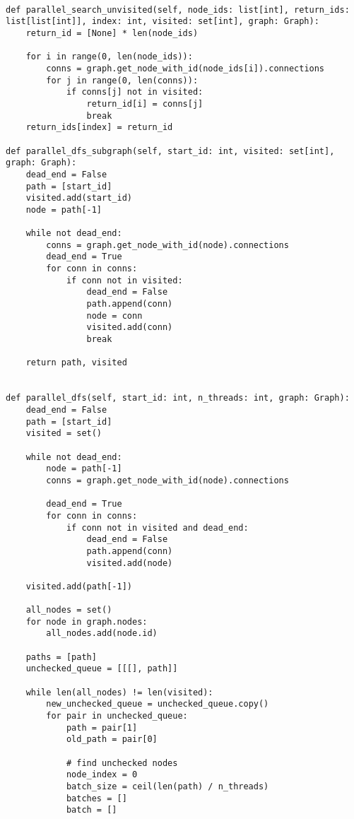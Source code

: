 \begin{lstlisting}[label=some-code-2,caption=Реализация параллельного алгоритма поиска в глубину]

def parallel_search_unvisited(self, node_ids: list[int], return_ids: list[list[int]], index: int, visited: set[int], graph: Graph):
    return_id = [None] * len(node_ids)

    for i in range(0, len(node_ids)):
        conns = graph.get_node_with_id(node_ids[i]).connections
        for j in range(0, len(conns)):
            if conns[j] not in visited:
                return_id[i] = conns[j]
                break
    return_ids[index] = return_id

def parallel_dfs_subgraph(self, start_id: int, visited: set[int], graph: Graph):
    dead_end = False
    path = [start_id]
    visited.add(start_id)
    node = path[-1]

    while not dead_end:
        conns = graph.get_node_with_id(node).connections
        dead_end = True
        for conn in conns:
            if conn not in visited:
                dead_end = False
                path.append(conn)
                node = conn
                visited.add(conn)
                break

    return path, visited
    

def parallel_dfs(self, start_id: int, n_threads: int, graph: Graph):
    dead_end = False
    path = [start_id]
    visited = set()

    while not dead_end:
        node = path[-1]
        conns = graph.get_node_with_id(node).connections
        
        dead_end = True
        for conn in conns:
            if conn not in visited and dead_end:
                dead_end = False
                path.append(conn)
                visited.add(node)
    
    visited.add(path[-1])

    all_nodes = set()
    for node in graph.nodes:
        all_nodes.add(node.id)
    
    paths = [path]        
    unchecked_queue = [[[], path]]

    while len(all_nodes) != len(visited):
        new_unchecked_queue = unchecked_queue.copy()
        for pair in unchecked_queue:
            path = pair[1]
            old_path = pair[0]

            # find unchecked nodes
            node_index = 0
            batch_size = ceil(len(path) / n_threads)
            batches = []
            batch = []


\end{lstlisting}

